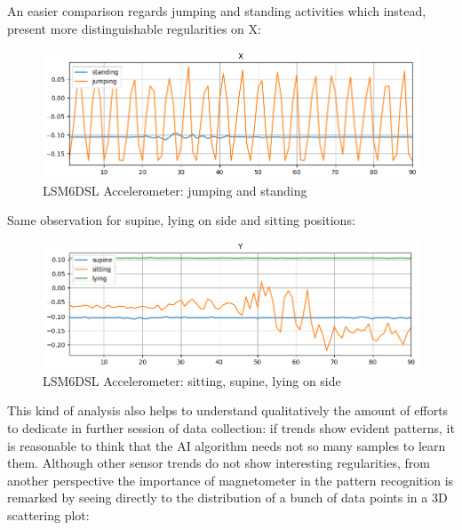 An easier comparison regards jumping and standing activities which instead, present more distinguishable regularities on X:
\begin{figure}[H]
		\hfill\includegraphics[scale=0.8]{figures/plot_ACC_LSM6DSL_DS_standing_jumping_X.png}\hspace*{\fill}
		\caption{LSM6DSL Accelerometer: jumping and standing}\label{fig:6}
		\centering
\end{figure} 
Same observation for supine, lying on side and sitting positions:
\begin{figure}[H]
	\hfill\includegraphics[scale=0.8]{figures/plot_ACC_LSM303AGR_DS_supine_sitting_lying_Y.png}\hspace*{\fill}
	\caption{LSM6DSL Accelerometer: sitting, supine, lying on side}\label{fig:7}
	\centering
\end{figure} 
This kind of analysis also helps to understand qualitatively the amount of efforts to dedicate in further session of data collection: if trends show evident patterns, it is reasonable to think that the AI algorithm needs not so many samples to learn them. Although other sensor trends do not show interesting regularities, from another perspective the importance of magnetometer in the pattern recognition is remarked by seeing directly to the distribution of a bunch of data points in a 3D scattering plot:
